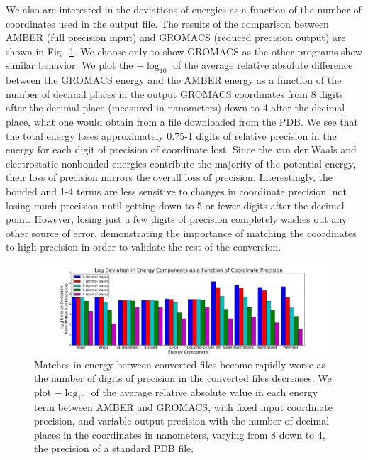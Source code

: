 We also are interested in the deviations of energies as a function of
the number of coordinates used in the output file. The results of the
comparison between AMBER (full precision input) and GROMACS (reduced
precision output) are shown in Fig.~\ref{fig:precision}.  We choose
only to show GROMACS as the other programs show similar behavior. We
plot the $-\log_{10}$ of the average relative absolute difference
between the GROMACS energy and the AMBER energy as a function of the
number of decimal places in the output GROMACS coordinates from 8
digits after the decimal place (measured in nanometers) down to 4
after the decimal place, what one would obtain from a file downloaded
from the PDB.  We see that the total energy loses approximately 0.75-1
digits of relative precision in the energy for each digit of precision
of coordinate lost. Since the van der Waals and electrostatic
nonbonded energies contribute the majority of the potential energy,
their loss of precision mirrors the overall loss of
precision. Interestingly, the bonded and 1-4 terms are less sensitive
to changes in coordinate precision, not losing much precision until
getting down to 5 or fewer digits after the decimal point.
  However,
losing just a few digits of precision completely washes out any other
source of error, demonstrating the importance of matching the
coordinates to high precision in order to validate the rest of the
conversion.

\begin{figure}[h]
\includegraphics[width=\textwidth]{precisioncomparison.pdf}   
\caption{Matches in energy between converted files become rapidly
  worse as the number of digits of precision in the converted files
  decreases. We plot $-\log_{10}$ of the average relative absolute
  value in each energy term between AMBER and GROMACS, with fixed
  input coordinate precision, and variable output precision with the
  number of decimal places in the coordinates in nanometers, varying
  from 8 down to 4, the precision of a standard PDB file.
\label{fig:precision}}
\end{figure}

